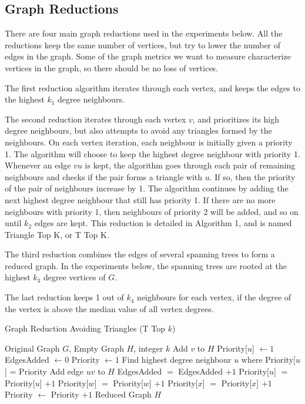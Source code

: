\documentclass[11pt]{article}
\begin{document}
\subsection{Graph Reductions}
There are four main graph reductions used in the experiments below.  All the reductions keep the same number of vertices, but try to lower the number of edges in the graph.  Some of the graph metrics we want to measure characterize vertices in the graph, so there should be no loss of vertices.  

The first reduction algorithm iterates through each vertex, and keeps the edges to the highest $k_1$ degree neighbours.

The second reduction iterates through each vertex $v$, and prioritizes its high degree neighbours, but also attempts to avoid any triangles formed by the neighbours.  On each vertex iteration, each neighbour is initially given a priority 1.  The algorithm will choose to keep the highest degree neighbour with priority 1.  Whenever an edge $vu$ is kept, the algorithm goes through each pair of remaining neighbours and checks if the pair forms a triangle with $u$.  If so, then the priority of the pair of neighbours increase by 1.  The algorithm continues by adding the next highest degree neighbour that still has priority 1.  If there are no more neighbours with priority 1, then neighbours of priority 2 will be added, and so on until $k_2$ edges are kept.  This reduction is detailed in Algorithm 1, and is named Triangle Top K, or T Top K.

The third reduction combines the edges of several spanning trees to form a reduced graph.  In the experiments below, the spanning trees are rooted at the highest $k_3$ degree vertices of $G$.

The last reduction keeps 1 out of $k_4$ neighbours for each vertex, if the degree of the vertex is above the median value of all vertex degrees.

\begin{algorithm}
\caption{Graph Reduction Avoiding Triangles (T Top $k$)}
\begin{algorithmic}[1]
	\REQUIRE Original Graph $G$, Empty Graph $H$, integer $k$
		\STATE Add $v$ to $H$
			\STATE Priority[$u$] $\leftarrow 1$
		\ENDFOR
		\STATE EdgesAdded $\leftarrow 0$
		\STATE Priority $\leftarrow 1$
			\STATE Find highest degree neighbour $u$ where Priority[$u$] = Priority
			\STATE Add edge $uv$ to $H$
			\STATE EdgesAdded $=$ EdgesAdded $+1$
					\STATE Priority[$u$] $=$ Priority[$u$] $+1$
					\STATE Priority[$w$] $=$ Priority[$w$] $+1$
					\STATE Priority[$x$] $=$ Priority[$x$] $+1$
				\ENDIF
			\ENDFOR
			\STATE Priority $\leftarrow$ Priority $+ 1$
		\ENDWHILE
	\ENDFOR
	\ENSURE Reduced Graph $H$
\end{algorithmic}
\end{algorithm}
\end{document}
